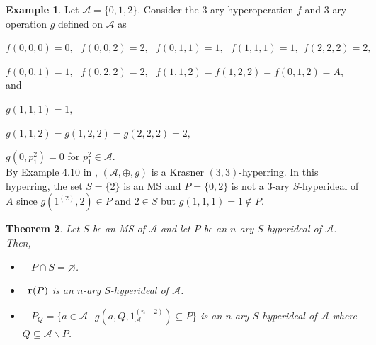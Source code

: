 \documentclass[preprint,review,10pt]{amsart}
\newtheorem{theorem}{Theorem}[section]
\theoremstyle{definition}
\newtheorem{example}[theorem]{Example}
\theoremstyle{remark}
\numberwithin{equation}{section}
\begin{document}
\begin{example} \label{ex} 
Let  $\mathscr{A}=\{0,1,2\}$. Consider  the  3-ary hyperoperation $f$ and 3-ary operation $g$   defined on $\mathscr{A}$ as   






$f(0,0,0)=0, \ \ \ f(0,0,2)=2, \ \ \ f(0,1,1)=1, \ \ \ f(1,1,1)=1, \ \ f(2,2,2)=2,$

$ f(0,0,1)=1,\ \ \ f(0,2,2)=2,\ \ \ f(1,1,2)=f(1,2,2)=f(0,1,2)=A,$\\
and

$ g(1,1,1)=1,$

$g(1,1,2)=g(1,2,2)=g(2,2,2)=2,$

 $g(0,p_1^2)=0$ for $p_1^2 \in \mathscr{A}$.\\
By Example 4.10 in  \cite{sorc1}, $(\mathscr{A},\oplus,g)$ is a Krasner $(3,3)$-hyperring. In this hyperring, the set $S=\{2\}$ is an MS and $P=\{0,2\}$ is not a 3-ary $S$-hyperideal of $A$ since $g(1^{(2)},2) \in P$  and $2 \in S$ but $g(1,1,1)=1\notin P$.
\end{example}
\begin{theorem} \label{1}
Let $S$ be an MS of  $\mathscr{A}$ and let $P$ be an $n$-ary $S$-hyperideal of  $\mathscr{A}$.  Then, 
\begin{itemize}
\item[\rm{{\bf (1) }}]~ $P \cap S=\varnothing$.
\item[\rm{{\bf (2) }}]~${\bf r}(P)$ is an $n$-ary $S$-hyperideal of  $\mathscr{A}$. 
\item[\rm{{\bf (3) }}]~ $P_Q=\{a \in \mathscr{A} \ \vert \ g(a,Q,1_\mathscr{A}^{(n-2)}) \subseteq P\}$ is an $n$-ary $S$-hyperideal of  $\mathscr{A}$ where $Q \subseteq \mathscr{A} \backslash P$. 
\end{itemize}
\end{theorem}
\end{document}

